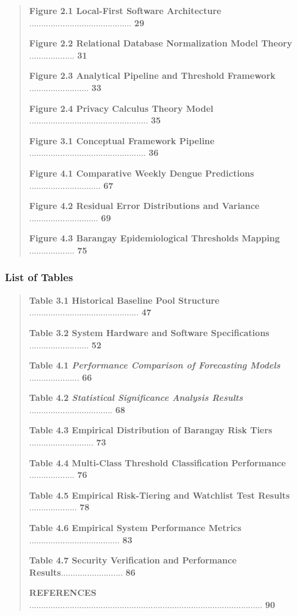 \documentclass[
]{article}
\begin{document}
\begin{quote}
\textbf{Figure 2.1 Local-First Software Architecture}
........................................... \textbf{29}

\textbf{Figure 2.2 Relational Database Normalization Model Theory}
................... \textbf{31}

\textbf{Figure 2.3 Analytical Pipeline and Threshold Framework}
......................... \textbf{33}

\textbf{Figure 2.4 Privacy Calculus Theory Model}
.................................................. \textbf{35}

\textbf{Figure 3.1 Conceptual Framework Pipeline}
................................................. \textbf{36}

\textbf{Figure 4.1 Comparative Weekly Dengue Predictions}
.............................. \textbf{67}

\textbf{Figure 4.2 Residual Error Distributions and Variance}
............................. \textbf{69}

\textbf{Figure 4.3 Barangay Epidemiological Thresholds Mapping}
................... \textbf{75}
\end{quote}

\subsubsection{\texorpdfstring{\textbf{List of
Tables}}{List of Tables}}\label{list-of-tables}

\begin{quote}
\textbf{Table 3.1 Historical Baseline Pool Structure}
.............................................. \textbf{47}

\textbf{Table 3.2 System Hardware and Software Specifications}
......................... \textbf{52}

\textbf{Table 4.1 \emph{Performance Comparison of Forecasting Models}}
..................... \textbf{66}

\textbf{Table 4.2 \emph{Statistical Significance Analysis Results}}
................................... \textbf{68}

\textbf{Table 4.3 Empirical Distribution of Barangay Risk Tiers}
........................... \textbf{73}

\textbf{Table 4.4 Multi-Class Threshold Classification Performance}
................... \textbf{76}

\textbf{Table 4.5 Empirical Risk-Tiering and Watchlist Test Results}
.................... \textbf{78}

\textbf{Table 4.6 Empirical System Performance Metrics}
...................................... \textbf{83}

\textbf{Table 4.7 Security Verification and Performance
Results}.......................... \textbf{86}

\textbf{REFERENCES}
..................................................................................................
\textbf{90}
\end{quote}
\end{document}
